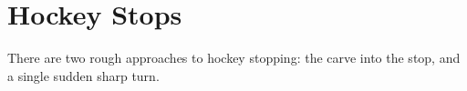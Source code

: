 \section{Hockey Stops}
\label{sec:stopping/hockey}

There are two rough approaches to hockey stopping: the carve into the stop, and a single sudden sharp turn.   


